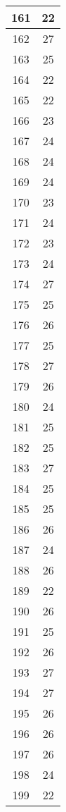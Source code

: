 \documentclass[letterpaper, 12pt]{article}
\begin{document}
\begin{longtable}{|c|c|}
161 & 22 \\
\hline
162 & 27 \\
\hline
163 & 25 \\
\hline
164 & 22 \\
\hline
165 & 22 \\
\hline
166 & 23 \\
\hline
167 & 24 \\
\hline
168 & 24 \\
\hline
169 & 24 \\
\hline
170 & 23 \\
\hline
171 & 24 \\
\hline
172 & 23 \\
\hline
173 & 24 \\
\hline
174 & 27 \\
\hline
175 & 25 \\
\hline
176 & 26 \\
\hline
177 & 25 \\
\hline
178 & 27 \\
\hline
179 & 26 \\
\hline
180 & 24 \\
\hline
181 & 25 \\
\hline
182 & 25 \\
\hline
183 & 27 \\
\hline
184 & 25 \\
\hline
185 & 25 \\
\hline
186 & 26 \\
\hline
187 & 24 \\
\hline
188 & 26 \\
\hline
189 & 22 \\
\hline
190 & 26 \\
\hline
191 & 25 \\
\hline
192 & 26 \\
\hline
193 & 27 \\
\hline
194 & 27 \\
\hline
195 & 26 \\
\hline
196 & 26 \\
\hline
197 & 26 \\
\hline
198 & 24 \\
\hline
199 & 22 \\
\hline
\end{longtable}
\end{document}
